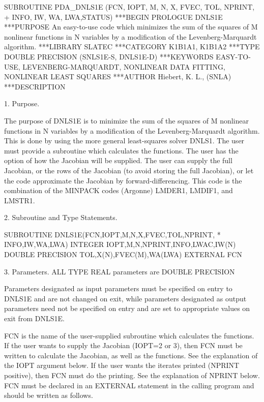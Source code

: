 \documentclass[11pt,twoside,nolof]{starlink}
\begin{document}
\begin{terminalv}
      SUBROUTINE PDA_DNLS1E (FCN, IOPT, M, N, X, FVEC, TOL, NPRINT,
     +                       INFO, IW, WA, LWA,STATUS)
***BEGIN PROLOGUE  DNLS1E
***PURPOSE  An easy-to-use code which minimizes the sum of the squares
            of M nonlinear functions in N variables by a modification
            of the Levenberg-Marquardt algorithm.
***LIBRARY   SLATEC
***CATEGORY  K1B1A1, K1B1A2
***TYPE      DOUBLE PRECISION (SNLS1E-S, DNLS1E-D)
***KEYWORDS  EASY-TO-USE, LEVENBERG-MARQUARDT, NONLINEAR DATA FITTING,
             NONLINEAR LEAST SQUARES
***AUTHOR  Hiebert, K. L., (SNLA)
***DESCRIPTION

 1. Purpose.

       The purpose of DNLS1E is to minimize the sum of the squares of M
       nonlinear functions in N variables by a modification of the
       Levenberg-Marquardt algorithm.  This is done by using the more
       general least-squares solver DNLS1.  The user must provide a
       subroutine which calculates the functions.  The user has the
       option of how the Jacobian will be supplied.  The user can
       supply the full Jacobian, or the rows of the Jacobian (to avoid
       storing the full Jacobian), or let the code approximate the
       Jacobian by forward-differencing.  This code is the combination
       of the MINPACK codes (Argonne) LMDER1, LMDIF1, and LMSTR1.


 2. Subroutine and Type Statements.

       SUBROUTINE DNLS1E(FCN,IOPT,M,N,X,FVEC,TOL,NPRINT,
      *                  INFO,IW,WA,LWA)
       INTEGER IOPT,M,N,NPRINT,INFO,LWAC,IW(N)
       DOUBLE PRECISION TOL,X(N),FVEC(M),WA(LWA)
       EXTERNAL FCN


 3. Parameters. ALL TYPE REAL parameters are DOUBLE PRECISION

       Parameters designated as input parameters must be specified on
       entry to DNLS1E and are not changed on exit, while parameters
       designated as output parameters need not be specified on entry
       and are set to appropriate values on exit from DNLS1E.

      FCN is the name of the user-supplied subroutine which calculates
         the functions.  If the user wants to supply the Jacobian
         (IOPT=2 or 3), then FCN must be written to calculate the
         Jacobian, as well as the functions.  See the explanation
         of the IOPT argument below.
         If the user wants the iterates printed (NPRINT positive), then
         FCN must do the printing.  See the explanation of NPRINT
         below.  FCN must be declared in an EXTERNAL statement in the
         calling program and should be written as follows.



\end{terminalv}
\end{document}
